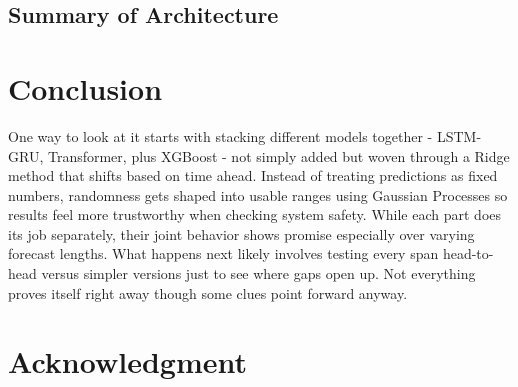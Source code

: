 \documentclass[conference]{IEEEtran}
\begin{document}
\subsection{Summary of Architecture}
\begin{table}[H]
\caption{Summary of Proposed Ensemble Components}
\begin{center}
\label{tab:architecture}
\end{center}
\end{table}

\section{Conclusion}
One way to look at it starts with stacking different models together - LSTM-GRU, Transformer, plus XGBoost - not simply added but woven through a Ridge method that shifts based on time ahead. Instead of treating predictions as fixed numbers, randomness gets shaped into usable ranges using Gaussian Processes so results feel more trustworthy when checking system safety. While each part does its job separately, their joint behavior shows promise especially over varying forecast lengths. What happens next likely involves testing every span head-to-head versus simpler versions just to see where gaps open up. Not everything proves itself right away though some clues point forward anyway.

\section*{Acknowledgment}
\end{document}
